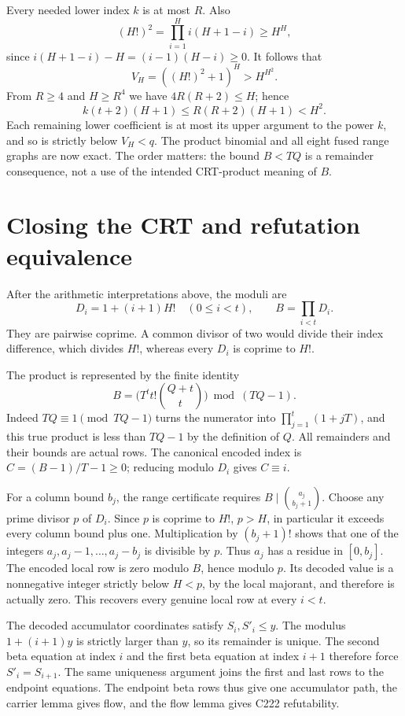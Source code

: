 \documentclass[11pt]{article}
\theoremstyle{definition}\newtheorem{definition}[theorem]{Definition}
\begin{document}
Every needed lower index $k$ is at most $R$. Also
\[
 (H!)^2=\prod_{i=1}^{H}i(H+1-i)\ge H^H,
\]
since $i(H+1-i)-H=(i-1)(H-i)\ge0$. It follows that
\[
 V_H=((H!)^2+1)^H>H^{H^2}.
\]
From $R\ge4$ and $H\ge R^4$ we have $4R(R+2)\le H$; hence
\[
 k(t+2)(H+1)\le R(R+2)(H+1)<H^2.
\]
Each remaining lower coefficient is at most its upper argument to the
power $k$, and so is strictly below $V_H<q$. The product binomial and
all eight fused range graphs are now exact. The order matters: the
bound $B<TQ$ is a remainder consequence, not a use of the intended
CRT-product meaning of $B$.

\section{Closing the CRT and refutation equivalence}
After the arithmetic interpretations above, the moduli are
\[
 D_i=1+(i+1)H!\quad(0\le i<t),\qquad B=\prod_{i<t}D_i.
\]
They are pairwise coprime. A common divisor of two would divide their
index difference, which divides $H!$, whereas every $D_i$ is coprime
to $H!$.

The product is represented by the finite identity
\[
 B=\bigl(T^t t!\binom{Q+t}{t}\bigr)\bmod(TQ-1).
\]
Indeed $TQ\equiv1\pmod{TQ-1}$ turns the numerator into
$\prod_{j=1}^t(1+jT)$, and this true product is less than $TQ-1$ by
the definition of $Q$. All remainders and their bounds are actual rows.
The canonical encoded index is
$C=(B-1)/T-1\ge0$; reducing modulo $D_i$ gives $C\equiv i$.

For a column bound $b_j$, the range certificate requires
$B\mid\binom{a_j}{b_j+1}$. Choose any prime divisor $p$ of $D_i$.
Since $p$ is coprime to $H!$, $p>H$, in particular it exceeds every
column bound plus one. Multiplication by $(b_j+1)!$ shows that one
of the integers $a_j,a_j-1,\ldots,a_j-b_j$ is divisible by $p$.
Thus $a_j$ has a residue in $[0,b_j]$. The encoded local row is zero
modulo $B$, hence modulo $p$. Its decoded value is a nonnegative
integer strictly below $H<p$, by the local majorant, and therefore
is actually zero. This recovers every genuine local row at every
$i<t$.

The decoded accumulator coordinates satisfy $S_i,S'_i\le y$.
The modulus $1+(i+1)y$ is strictly larger than $y$, so its remainder is
unique. The second beta equation at index $i$ and the first beta equation
at index $i+1$ therefore force $S'_i=S_{i+1}$. The same uniqueness
argument joins the first and last rows to the endpoint equations.
The endpoint beta rows thus give one accumulator path, the carrier
lemma gives flow, and the flow lemma gives C222 refutability.
\end{document}
